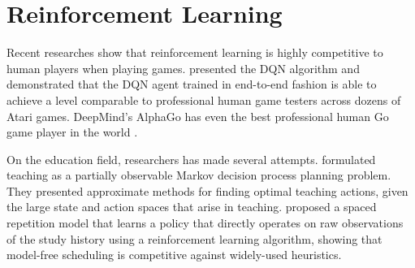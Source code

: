 \section{Reinforcement Learning}

    Recent researches show that reinforcement learning
    is highly competitive to human players when playing games.
    \textcite{mnih_human-level_2015} presented the DQN algorithm and demonstrated that
    the DQN agent trained in end-to-end fashion is able to achieve a level comparable to
    professional human game testers across dozens of Atari games.
    DeepMind's AlphaGo\cite{silver2016mastering}
    has even the best professional human Go game player in the world \cite{silver2017mastering}.

    On the education field, researchers has made several attempts.
    \textcite{rafferty2016faster} formulated teaching as a
    partially observable Markov decision process planning problem.
    They presented approximate methods for finding optimal teaching actions,
    given the large state and action spaces that arise in teaching.
    \textcite{reddy_accelerating_2017} proposed a spaced repetition model
    that learns a policy that directly operates on raw observations of the study history
    using a reinforcement learning algorithm,
    showing that model-free scheduling is competitive against widely-used heuristics.
















